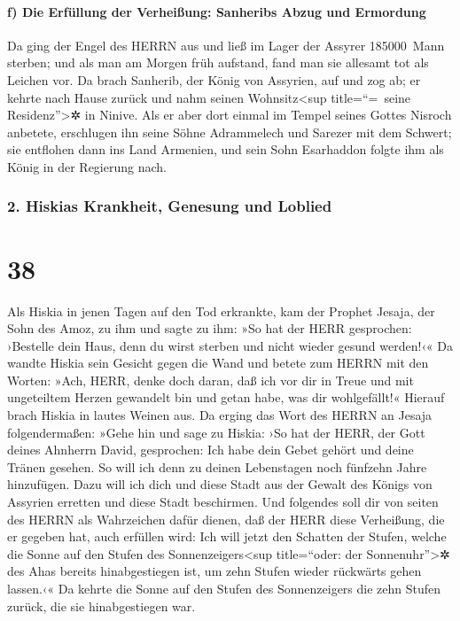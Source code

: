 \hypertarget{f-die-erfuxfcllung-der-verheiuxdfung-sanheribs-abzug-und-ermordung}{%
\paragraph{f) Die Erfüllung der Verheißung: Sanheribs Abzug und
Ermordung}\label{f-die-erfuxfcllung-der-verheiuxdfung-sanheribs-abzug-und-ermordung}}

Da ging der Engel des HERRN aus und ließ im Lager der
Assyrer 185000~Mann sterben; und als man am Morgen früh aufstand, fand
man sie allesamt tot als Leichen vor. Da brach Sanherib,
der König von Assyrien, auf und zog ab; er kehrte nach Hause zurück und
nahm seinen Wohnsitz\textless sup title=``=~seine
Residenz''\textgreater✲ in Ninive. Als er aber dort
einmal im Tempel seines Gottes Nisroch anbetete, erschlugen ihn seine
Söhne Adrammelech und Sarezer mit dem Schwert; sie entflohen dann ins
Land Armenien, und sein Sohn Esarhaddon folgte ihm als König in der
Regierung nach.

\hypertarget{hiskias-krankheit-genesung-und-loblied}{%
\subsubsection{2. Hiskias Krankheit, Genesung und
Loblied}\label{hiskias-krankheit-genesung-und-loblied}}

\hypertarget{section-37}{%
\section{38}\label{section-37}}

Als Hiskia in jenen Tagen auf den Tod erkrankte, kam der
Prophet Jesaja, der Sohn des Amoz, zu ihm und sagte zu ihm: »So hat der
HERR gesprochen: ›Bestelle dein Haus, denn du wirst sterben und nicht
wieder gesund werden!‹« Da wandte Hiskia sein Gesicht
gegen die Wand und betete zum HERRN mit den Worten: »Ach,
HERR, denke doch daran, daß ich vor dir in Treue und mit ungeteiltem
Herzen gewandelt bin und getan habe, was dir wohlgefällt!« Hierauf brach
Hiskia in lautes Weinen aus. Da erging das Wort des HERRN
an Jesaja folgendermaßen: »Gehe hin und sage zu Hiskia:
›So hat der HERR, der Gott deines Ahnherrn David, gesprochen: Ich habe
dein Gebet gehört und deine Tränen gesehen. So will ich denn zu deinen
Lebenstagen noch fünfzehn Jahre hinzufügen. Dazu will ich
dich und diese Stadt aus der Gewalt des Königs von Assyrien erretten und
diese Stadt beschirmen. Und folgendes soll dir von seiten
des HERRN als Wahrzeichen dafür dienen, daß der HERR diese Verheißung,
die er gegeben hat, auch erfüllen wird: Ich will jetzt den
Schatten der Stufen, welche die Sonne auf den Stufen des
Sonnenzeigers\textless sup title=``oder: der Sonnenuhr''\textgreater✲
des Ahas bereits hinabgestiegen ist, um zehn Stufen wieder rückwärts
gehen lassen.‹« Da kehrte die Sonne auf den Stufen des Sonnenzeigers die
zehn Stufen zurück, die sie hinabgestiegen war.

